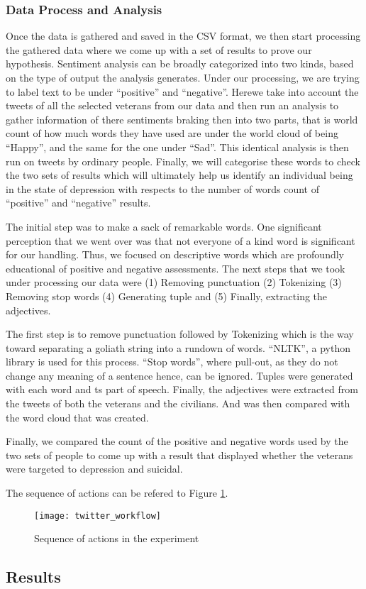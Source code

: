\subsubsection{Data Process and Analysis}

Once the data is gathered and saved in the CSV format, we then start processing
the gathered data where we come up with a set of results to prove our
hypothesis. Sentiment analysis can be broadly categorized into two kinds, based
on the type of output the analysis generates. Under our processing, we are
trying to label text to be under \enquote{positive} and \enquote{negative}. Herewe take into
account the tweets of all the selected veterans from our data and then run an
analysis to gather information of there sentiments braking then into two parts,
that is world count of how much words they have used are under the world cloud
of being \enquote{Happy}, and the same for the one under \enquote{Sad}. This identical analysis
is then run on tweets by ordinary people. Finally, we will categorise these
words to check the two sets of results which will ultimately help us identify
an individual being in the state of depression with respects to the number of
words count of \enquote{positive} and \enquote{negative} results.

The initial step was to make a sack of remarkable words. One significant
perception that we went over was that not everyone of a kind word is significant
for our handling. Thus, we focused on descriptive words which are profoundly
educational of positive and negative assessments. The next steps that we took
under processing our data were (1) Removing punctuation (2) Tokenizing (3)
Removing stop words (4) Generating tuple and (5) Finally, extracting the
adjectives.

The first step is to remove punctuation followed by Tokenizing which is the way
toward separating a goliath string into a rundown of words. “NLTK”, a python
library is used for this process. “Stop words”, where pull-out, as they do not
change any meaning of a sentence hence, can be ignored. Tuples were generated
with each word and ts part of speech. Finally, the adjectives were extracted
from the tweets of both the veterans and the civilians. And was then compared
with the word cloud that was created.

Finally, we compared the count of the positive and negative words used by the
two sets of people to come up with a result that displayed whether the veterans
were targeted to depression and suicidal.

The sequence of actions can be refered to Figure \ref{pic:workflow}.

\begin{figure}[h]
  \centering
  \caption{Sequence of actions in the experiment}
  \label{pic:workflow}
  \texttt{[image: twitter\_workflow]}
\end{figure}

\subsection{Results}

